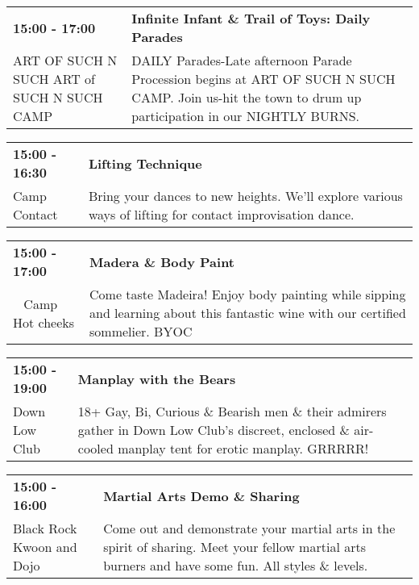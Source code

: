 \begin{tabular}{ p{1in} p{2.2in} }
    \textbf{15:00 - 17:00} & \textbf{Infinite Infant \& Trail of Toys: Daily Parades} \\
    ART OF SUCH N SUCH \newline ART of SUCH N SUCH CAMP & DAILY Parades-Late afternoon
Parade Procession begins at ART OF SUCH N SUCH CAMP. Join us-hit the town to drum up participation in our NIGHTLY BURNS. \\
    \hline 
\end{tabular}
    
\begin{tabular}{ p{1in} p{2.2in} }
    \textbf{15:00 - 16:30} & \textbf{Lifting Technique} \\
    Camp Contact \newline  & Bring your dances to new heights. We'll explore various ways of lifting for contact improvisation dance. \\
    \hline 
\end{tabular}
    
\begin{tabular}{ p{1in} p{2.2in} }
    \textbf{15:00 - 17:00} & \textbf{Madera \& Body Paint} \\
    ~ \newline Camp Hot cheeks & Come taste Madeira!  Enjoy body painting while sipping and learning about this  fantastic wine with our certified sommelier. BYOC \\
    \hline 
\end{tabular}
    
\begin{tabular}{ p{1in} p{2.2in} }
    \textbf{15:00 - 19:00} & \textbf{Manplay with the Bears} \\
    Down Low Club \newline  & 18+ Gay, Bi, Curious \& Bearish men \& their admirers gather in Down Low Club's discreet, enclosed \& air-cooled manplay tent for erotic manplay. GRRRRR! \\
    \hline 
\end{tabular}
    
\begin{tabular}{ p{1in} p{2.2in} }
    \textbf{15:00 - 16:00} & \textbf{Martial Arts Demo \& Sharing} \\
    Black Rock Kwoon and Dojo \newline  & Come out and demonstrate your martial arts in the spirit of sharing. Meet your fellow martial arts burners and have some fun. All styles \& levels. \\
    \hline 
\end{tabular}
    
